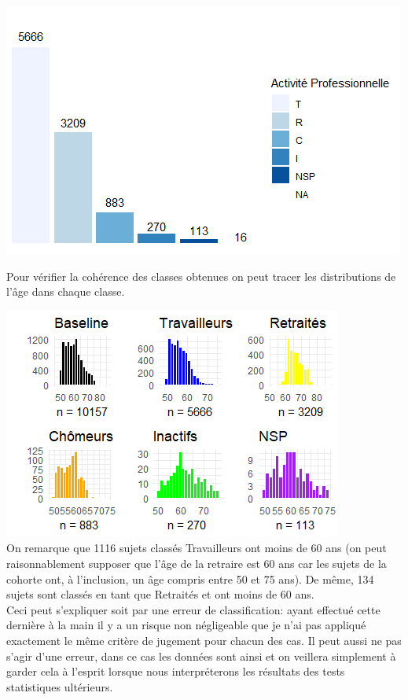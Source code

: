 \documentclass{book}
\begin{document}
\begin{center}
\includegraphics[scale=1]{activpro_barplot_manuel.png}
\end{center}
\newpage
\noindent
Pour vérifier la cohérence des classes obtenues on peut tracer les distributions de l'âge dans chaque classe.

\includegraphics[scale=1.3]{plot_grid_hist_age_activproBis.png}\\
\noindent
On remarque que 1116 sujets classés Travailleurs ont moins de 60 ans (on peut raisonnablement supposer que l'âge de la retraire est 60 ans car les sujets de la cohorte ont, à l'inclusion, un âge compris entre 50 et 75 ans).
De même, 134 sujets sont classés en tant que Retraités et ont moins de 60 ans.\\
\noindent
Ceci peut s'expliquer soit par une erreur de classification: ayant effectué cette dernière à la main il y a un risque non négligeable que je n'ai pas appliqué exactement le même critère de jugement pour chacun des cas. Il peut aussi ne pas s'agir d'une erreur, dans ce cas les données sont ainsi et on veillera simplement à garder cela à l'esprit lorsque nous interpréterons les résultats des tests statistiques ultérieurs.
\end{document}
